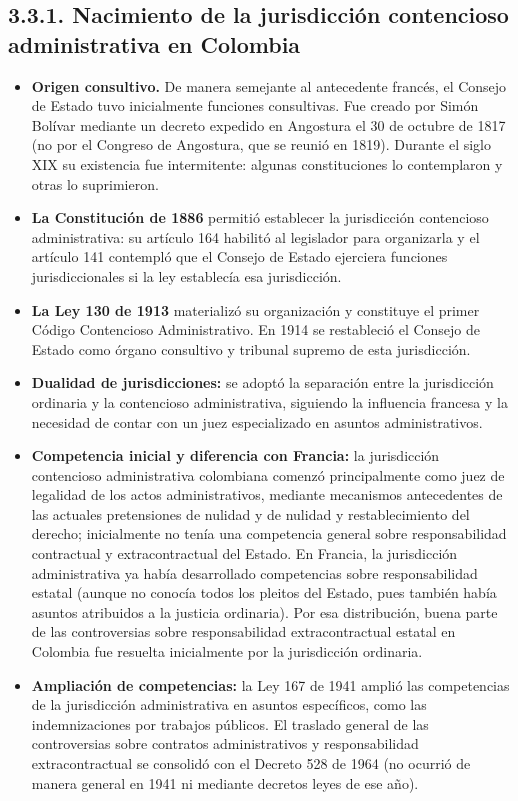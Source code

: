 \subsection{3.3.1. Nacimiento de la jurisdicción contencioso administrativa en Colombia}
\begin{itemize}
\item \textbf{Origen consultivo.} De manera semejante al antecedente francés, el Consejo de Estado tuvo inicialmente funciones consultivas. Fue creado por Simón Bolívar mediante un decreto expedido en Angostura el 30 de octubre de 1817 (no por el Congreso de Angostura, que se reunió en 1819). Durante el siglo XIX su existencia fue intermitente: algunas constituciones lo contemplaron y otras lo suprimieron.
\item \textbf{La Constitución de 1886} permitió establecer la jurisdicción contencioso administrativa: su artículo 164 habilitó al legislador para organizarla y el artículo 141 contempló que el Consejo de Estado ejerciera funciones jurisdiccionales si la ley establecía esa jurisdicción.
\item \textbf{La Ley 130 de 1913} materializó su organización y constituye el primer Código Contencioso Administrativo. En 1914 se restableció el Consejo de Estado como órgano consultivo y tribunal supremo de esta jurisdicción.
\item \textbf{Dualidad de jurisdicciones:} se adoptó la separación entre la jurisdicción ordinaria y la contencioso administrativa, siguiendo la influencia francesa y la necesidad de contar con un juez especializado en asuntos administrativos.
\item \textbf{Competencia inicial y diferencia con Francia:} la jurisdicción contencioso administrativa colombiana comenzó principalmente como juez de legalidad de los actos administrativos, mediante mecanismos antecedentes de las actuales pretensiones de nulidad y de nulidad y restablecimiento del derecho; inicialmente no tenía una competencia general sobre responsabilidad contractual y extracontractual del Estado. En Francia, la jurisdicción administrativa ya había desarrollado competencias sobre responsabilidad estatal (aunque no conocía todos los pleitos del Estado, pues también había asuntos atribuidos a la justicia ordinaria). Por esa distribución, buena parte de las controversias sobre responsabilidad extracontractual estatal en Colombia fue resuelta inicialmente por la jurisdicción ordinaria.
\item \textbf{Ampliación de competencias:} la Ley 167 de 1941 amplió las competencias de la jurisdicción administrativa en asuntos específicos, como las indemnizaciones por trabajos públicos. El traslado general de las controversias sobre contratos administrativos y responsabilidad extracontractual se consolidó con el Decreto 528 de 1964 (no ocurrió de manera general en 1941 ni mediante decretos leyes de ese año).
\end{itemize}
